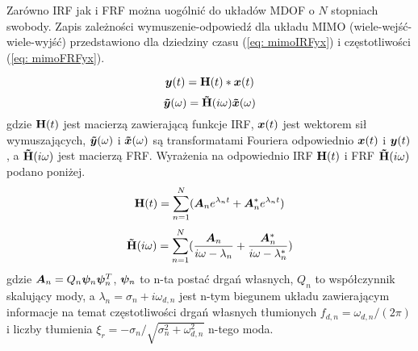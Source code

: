 Zarówno IRF jak i FRF można uogólnić do układów MDOF o $N$ stopniach swobody. Zapis zależności wymuszenie-odpowiedź dla układu MIMO (wiele-wejść-wiele-wyjść) przedstawiono dla dziedziny czasu (\ref{eq: mimoIRFyx}) i częstotliwości (\ref{eq: mimoFRFyx}).

\begin{equation} \label{eq: mimoIRFyx}
	\bm{y}(t)=\mathbf{H}(t)*\bm{x}(t)
\end{equation}
\begin{equation} \label{eq: mimoFRFyx}
	\bm{\tilde{y}}(\omega)=\mathbf{\tilde{H}}(i\omega)\bm{\tilde{x}}(\omega)
\end{equation}
gdzie $\mathbf{H}(t)$ jest macierzą zawierającą funkcje IRF, $\bm{x}(t)$ jest wektorem sił wymuszających, $\bm{\tilde{y}}(\omega)$ i $\bm{\tilde{x}}(\omega)$ są transformatami Fouriera odpowiednio $\bm{x}(t)$ i $\bm{y}(t)$, a $\mathbf{\tilde{H}}(i\omega)$ jest macierzą FRF. Wyrażenia na odpowiednio IRF $\mathbf{H}(t)$ i FRF $\mathbf{\tilde{H}}(i\omega)$ podano poniżej.
\begin{equation} \label{eq: IRFmimo}
	\mathbf{H}(t)=\sum_{n=1}^{N}(\bm{A}_n e^{\lambda_n t} + \bm{A}_n^* e^{\lambda_n t})
\end{equation} 
\begin{equation} \label{eq: FRFmimo}
	\mathbf{\tilde{H}}(i\omega)=\sum_{n=1}^{N}(\frac{\bm{A}_n}{i\omega-\lambda_n} + \frac{\bm{A}_n^*}{i\omega-\lambda_n^*})
\end{equation}
gdzie $\bm{A}_n=Q_n \bm{\psi}_n\bm{\psi}_n^T$, $\bm{\psi}_n$ to n-ta postać drgań własnych, $Q_n$ to współczynnik skalujący mody, a $\lambda_n=\sigma_n+i\omega_{d,n}$ jest n-tym biegunem układu zawierającym informacje na temat częstotliwości drgań własnych tłumionych $f_{d,n}=\omega_{d,n}/(2\pi)$ i liczby tłumienia $\xi_r=-\sigma_n/\sqrt{\sigma_n^2+\omega_{d,n}^2}$ n-tego moda.






